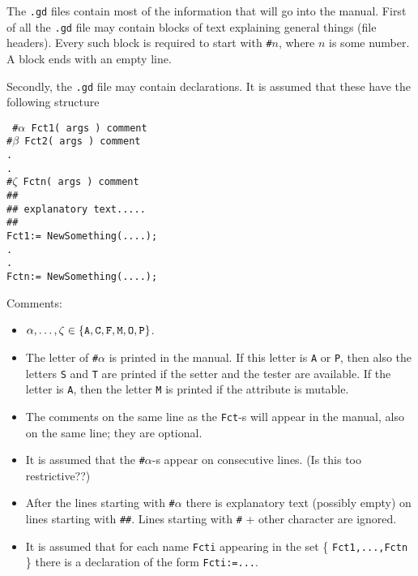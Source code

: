 \documentclass[a4wide]{article}
\begin{document}
The {\tt .gd} files contain most of the information that will go into the
manual.
First of all the {\tt .gd} file may contain blocks of text explaining general 
things (file headers). Every such block is required to start with {\tt \#}$n$,
where $n$ is some number. A block ends with an empty line.\par
Secondly, the {\tt .gd} file may contain declarations. It is assumed that
these have the following structure\par
\vspace{2mm}
{\tt
\noindent \#$\alpha$ Fct1( args ) \quad \quad comment\\
\#$\beta$ Fct2( args ) \quad \quad comment\\
.\\
.\\
\#$\zeta$ Fctn( args ) \quad \quad comment\\
\#\#\\
\#\#   explanatory text.....\\
\#\#\\
Fct1:= NewSomething(....);\\
.\\
.\\
Fctn:= NewSomething(....);
}
\par
\vspace{2mm}
Comments:
\begin{itemize}
\item $\alpha,\ldots,\zeta\in \{{\tt A},{\tt C},{\tt F},{\tt M},{\tt O},
{\tt P}\}$.
\item The letter of {\tt \#}$\alpha$ is printed in the manual. If this
letter is {\tt A} or {\tt P}, then also the letters {\tt S} and {\tt T}
are printed if the setter and the tester are available. If the letter
is {\tt A}, then the letter {\tt M} is printed if the attribute is mutable.
\item The comments on the same line as the {\tt Fct}-s will appear in
the manual, also on the same line; they are optional.
\item It is assumed that the {\tt \#}$\alpha$-s appear on consecutive lines.
(Is this too restrictive??)
\item After the lines starting with {\tt \#}$\alpha$ there is explanatory
text (possibly empty) on lines starting with {\tt \#\#}. Lines starting with
{\tt \#} + other character are ignored.
\item It is assumed that for each name {\tt Fcti} appearing in the set 
\{ {\tt Fct1,...,Fctn} \} there is a declaration of the form {\tt Fcti:=...}.
\end{itemize}
\end{document}
